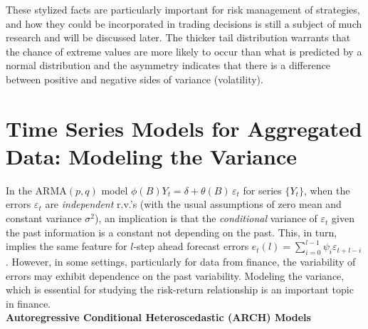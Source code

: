 These stylized facts are particularly important for risk management of strategies, and how they could be incorporated in trading decisions is still a subject of much research and will be discussed later. The thicker tail distribution warrants that the chance of extreme values are more likely to occur than what is predicted by a normal distribution and the asymmetry indicates that there is a difference between positive and negative sides of variance (volatility). 


\section{Time Series Models for Aggregated Data: Modeling the Variance}


In the ARMA$(p,q)$ model $\phi(B)Y_t= \delta + \theta(B) \,\varepsilon_t$ for series $\{Y_t\}$, when the errors $\varepsilon_t$ are \textit{independent} r.v.'s (with the usual assumptions of zero mean and constant variance $\sigma^2$), an implication is that the \textit{conditional} variance of $\varepsilon_t$ given the past information is a constant not depending on the past. This, in turn, implies the same feature for $l$-step ahead forecast errors $e_t(l) = \sum_{i=0}^{l-1}\psi_i\varepsilon_{t+l-i}$. However, in some settings, particularly for data from finance, the variability of errors may exhibit dependence on the past variability. Modeling the variance, which is essential for studying the risk-return relationship is an important topic in finance. \\


\noindent \textbf{Autoregressive Conditional Heteroscedastic (ARCH) Models} \\


